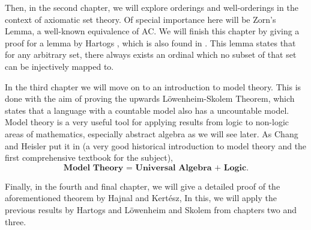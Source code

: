 \documentclass[../../main.tex]{subfiles}
\begin{document}
Then, in the second chapter, we will explore orderings and well-orderings in the context of axiomatic set theory.
Of special importance here will be Zorn's Lemma, a well-known equivalence of AC.
We will finish this chapter by giving a proof for a lemma by Hartogs \cite{Har15}, which is also found in \cite{Haj72}.
This lemma states that for any arbitrary set, there always exists an ordinal which no subset of that set can be injectively mapped to.

In the third chapter we will move on to an introduction to model theory. 
This is done with the aim of proving the upwards Löwenheim-Skolem Theorem, which states that a language with a countable model also has a uncountable model.
Model theory is a very useful tool for applying results from logic to non-logic areas of mathematics, especially abstract algebra as we will see later.
As Chang and Heisler put it in \cite{Cha90} (a very good historical introduction to model theory and the first comprehensive textbook for the subject), $$\textbf{Model Theory = Universal Algebra + Logic}.$$

Finally, in the fourth and final chapter, we will give a detailed proof of the aforementioned theorem by Hajnal and Kertész,
In this, we will apply the previous results by Hartogs and Löwenheim and Skolem from chapters two and three.
\end{document}

